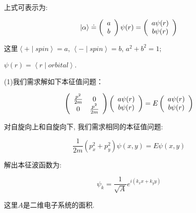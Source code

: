 \begin{enumerate}
上式可表示为:

\begin{equation*}
    \left| \alpha \right\rangle \doteq \left( {\begin{array}{*{20}c}
   {a}  \\
   {b}  \\
 \end{array} } \right)
 \psi(r) = \left( {\begin{array}{*{20}c}
   {a \psi(r)}  \\
   {b} \psi(r) \\
 \end{array} } \right)
\end{equation*}

这里$\left\langle + \mid spin \right\rangle = a$, $\left\langle
-\mid spin \right\rangle = b$, $a^2 + b^2 =1$;

$\psi(r)= \left\langle r \mid orbital \right\rangle$.

(1)我们需求解如下本征值问题：

\begin{equation*}
\left( {\begin{array}{*{20}c}
   {\frac{p^2}{2m}} & {0}  \\
   {0} & {\frac{p^2}{2m}}  \\
 \end{array} } \right)
\left( {\begin{array}{*{20}c}
   {a \psi(r)}  \\
   {b} \psi(r) \\
 \end{array} } \right)
= E \left( {\begin{array}{*{20}c}
   {a \psi(r)}  \\
   {b} \psi(r) \\
 \end{array} } \right)
\end{equation*}

对自旋向上和自旋向下, 我们需求相同的本征值问题:

\begin{equation*}
    \frac{1}{2m}\left( p_x^2 + p_y^2  \right) \psi(x,y)= E \psi(x,y)
\end{equation*}

解出本征波函数为:

\begin{equation*}
\psi_k = \frac{1}{\sqrt A} e^{i(k_x x + k_y y)}
\end{equation*}

这里$A$是二维电子系统的面积.


\end{enumerate}
